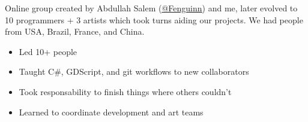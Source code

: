 \documentclass[10pt,a4paper,ragged2e,withhyper]{altacv}
\begin{document}
\begin{paracol}{2}

		\divider

		\vspace{-0.3cm}
		\begin{justify}
			Online group created by Abdullah Salem (\href{https://github.com/Fenguinn}{\uline{@Fenguinn}}) and me, later evolved to 10 programmers + 3 artists which took turns aiding our projects. We had people from USA, Brazil, France, and China.
		\end{justify}
		\vspace{-0.2cm}
		\medskip

		\begin{itemize}
			\item Led 10+ people
			\item Taught C\#, GDScript, and git workflows to new collaborators
			\item Took responsability to finish things where others couldn't
			\item Learned to coordinate development and art teams
		\end{itemize}



		\newpage

		\switchcolumn

		\CVTagC
		\CVTagCPlusPlus
		\CVTagCSharp
		\CVTagGDScript
		\CVTagHTMLCSS
		\CVTagJava \\ %
		\CVTagJSNode
		\CVTagLaTeX
		\CVTagLua
		\CVTagPython
		\CVTagRuby
		\CVTagScala
		\CVTagSQL
		\CVTagTypeScript

		\CVTagZIO
		\CVTagSBT
		\CVTagNUnit
		\CVTagWPF
		\CVTagMongoDB
		\CVTagMySQL \\ %
		\CVTagPostgreSQL
		\CVTagDjango
		\CVTagOCRA
		\CVTagCodeMirrorJs \\ %
		\CVTagdatGUI
		\CVTagExpress
		\CVTagGulp
		\CVTagNextJS
		\CVTagPFiveJS
		\CVTagPostCSS
		\CVTagReact
		\CVTagReactNative
		\CVTagRollup
		\CVTagSCSSSass
		\CVTagSnowpack
		\CVTagSolidJS
		\CVTagStylus
		\CVTagVite
		\CVTagWebpack
		\CVTagDefold
		\CVTagGodot
		\CVTagPhaser
		\CVTagUE
		\CVTagUnity


\end{paracol}
\end{document}
